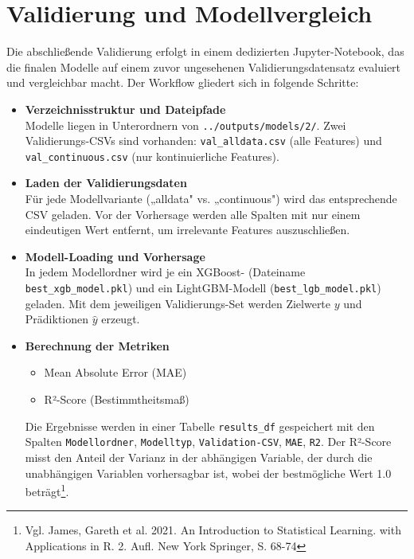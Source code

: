 \section{Validierung und Modellvergleich}

Die abschließende Validierung erfolgt in einem dedizierten Jupyter-Notebook, das die finalen Modelle auf einem zuvor ungesehenen Validierungsdatensatz evaluiert und vergleichbar macht. Der Workflow gliedert sich in folgende Schritte:

\begin{itemize}
  \item \textbf{Verzeichnisstruktur und Dateipfade}\\
  Modelle liegen in Unterordnern von \texttt{../outputs/models/2/}. Zwei Validierungs-CSVs sind vorhanden: \texttt{val\_alldata.csv} (alle Features) und \texttt{val\_continuous.csv} (nur kontinuierliche Features).
  
  \item \textbf{Laden der Validierungsdaten}\\
  Für jede Modellvariante („alldata" vs. „continuous") wird das entsprechende CSV geladen. Vor der Vorhersage werden alle Spalten mit nur einem eindeutigen Wert entfernt, um irrelevante Features auszuschließen.
  
  \item \textbf{Modell-Loading und Vorhersage}\\
  In jedem Modellordner wird je ein XGBoost- (Dateiname \texttt{best\_xgb\_model.pkl}) und ein LightGBM-Modell (\texttt{best\_lgb\_model.pkl}) geladen. Mit dem jeweiligen Validierungs-Set werden Zielwerte \(y\) und Prädiktionen \(\hat{y}\) erzeugt.
  
  \item \textbf{Berechnung der Metriken}\\
  \begin{itemize}
    \item Mean Absolute Error (MAE)
    \item R²-Score (Bestimmtheitsmaß)
  \end{itemize}
  Die Ergebnisse werden in einer Tabelle \texttt{results\_df} gespeichert mit den Spalten \texttt{Modellordner}, \texttt{Modelltyp}, \texttt{Validation-CSV}, \texttt{MAE}, \texttt{R2}. Der R²-Score misst den Anteil der Varianz in der abhängigen Variable, der durch die unabhängigen Variablen vorhersagbar ist, wobei der bestmögliche Wert 1.0 beträgt\footnote{Vgl. James, Gareth et al. 2021. An Introduction to Statistical Learning. with Applications in R. 2. Aufl. New York Springer, S. 68-74}.
  

\end{itemize}
